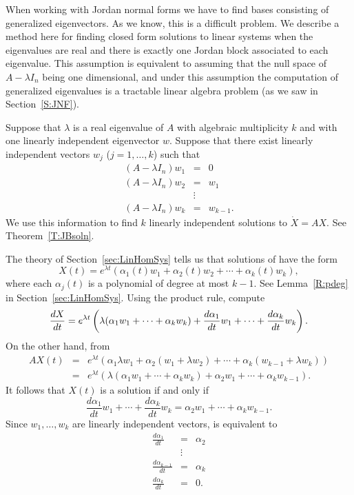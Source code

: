 \documentclass{ximera}
\begin{document}
When working with Jordan normal forms we have to 
find bases consisting of generalized eigenvectors.  As we know, this is a 
difficult problem.  We describe a method here for finding closed form 
solutions to linear systems when the eigenvalues are real and there is 
exactly one Jordan block associated to each eigenvalue.  
This assumption is equivalent to assuming that the null space of 
$A-\lambda I_n$ being one dimensional, and under this assumption the 
computation of generalized eigenvalues is a tractable linear algebra problem 
(as we saw in Section~\ref{S:JNF}).

Suppose that $\lambda$ is a real eigenvalue of $A$ with algebraic
multiplicity $k$ and with one linearly independent eigenvector $w$.   Suppose 
that there exist linearly independent vectors $w_j$ ($j=1,\ldots,k$) such that
\begin{equation}  \label{eq:genvec}
\begin{array}{rcl}
(A-\lambda I_n)w_1 & = & 0 \\
(A-\lambda I_n)w_2 & = & w_1 \\
& \vdots & \\
(A-\lambda I_n)w_k & = & w_{k-1}.
\end{array}
\end{equation}
We use this information to find $k$ linearly independent solutions to
$\dot{X}=AX$.  See Theorem~\ref{T:JBsoln}.

The theory of Section~\ref{sec:LinHomSys} tells us that solutions of
 have the form
\[
X(t)=e^{\lambda t}(\alpha_1(t)w_1+\alpha_2(t)w_2+\cdots+\alpha_k(t)w_k),
\]
where each $\alpha_j(t)$ is a polynomial of degree at most $k-1$.  See 
Lemma~\ref{R:pdeg} in Section~\ref{sec:LinHomSys}.  Using the product rule, 
compute
\[
\displaystyle\frac{dX}{dt} = e^{\lambda t}
\left(\lambda (\alpha_1w_1+\cdots+\alpha_kw_k)+
\frac{d\alpha_1}{dt}w_1+\cdots+\frac{d\alpha_k}{dt}w_k\right).
\]
On the other hand, from 
\begin{eqnarray*}
AX(t) & = & e^{\lambda t}(\alpha_1\lambda w_1+\alpha_2(w_1+\lambda w_2)
+\cdots+\alpha_k(w_{k-1}+\lambda w_k))\\
& = & e^{\lambda t}(\lambda (\alpha_1w_1+\cdots+\alpha_kw_k) +
\alpha_2w_1 + \cdots+ \alpha_kw_{k-1}).
\end{eqnarray*}
It follows that $X(t)$ is a solution if and only if
\begin{equation}  \label{E:alphas}
\frac{d\alpha_1}{dt}w_1+\cdots+
\frac{d\alpha_k}{dt}w_k= \alpha_2w_1 + \cdots+ \alpha_kw_{k-1}.
\end{equation}
Since $w_1,\ldots,w_k$ are linearly independent vectors,  is 
equivalent to
\begin{eqnarray*}
\frac{d\alpha_1}{dt} & = & \alpha_2    \\
                     & \vdots &        \\
\frac{d\alpha_{k-1}}{dt} & = & \alpha_k \\
\frac{d\alpha_k}{dt}  & = & 0.
\end{eqnarray*}
\end{document}
